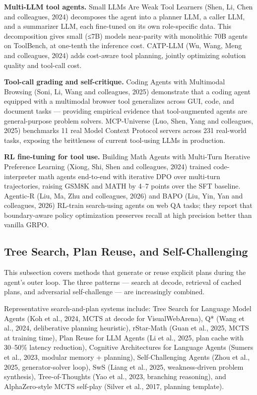 \textbf{Multi-LLM tool agents.} Small LLMs Are Weak Tool Learners (Shen, Li, Chen and colleagues, 2024) decomposes the agent into a planner LLM, a caller LLM, and a summarizer LLM, each fine-tuned on its own role-specific data. This decomposition gives small (≤7B) models near-parity with monolithic 70B agents on ToolBench, at one-tenth the inference cost. CATP-LLM (Wu, Wang, Meng and colleagues, 2024) adds cost-aware tool planning, jointly optimizing solution quality and tool-call cost.

\textbf{Tool-call grading and self-critique.} Coding Agents with Multimodal Browsing (Soni, Li, Wang and colleagues, 2025) demonstrate that a coding agent equipped with a multimodal browser tool generalizes across GUI, code, and document tasks --- providing empirical evidence that tool-augmented agents are general-purpose problem solvers. MCP-Universe (Luo, Shen, Yang and colleagues, 2025) benchmarks 11 real Model Context Protocol servers across 231 real-world tasks, exposing the brittleness of current tool-using LLMs in production.

\textbf{RL fine-tuning for tool use.} Building Math Agents with Multi-Turn Iterative Preference Learning (Xiong, Shi, Shen and colleagues, 2024) trained code-interpreter math agents end-to-end with iterative DPO over multi-turn trajectories, raising GSM8K and MATH by 4--7 points over the SFT baseline. Agentic-R (Liu, Ma, Zhu and colleagues, 2026) and BAPO (Liu, Yin, Yan and colleagues, 2026) RL-train search-using agents on web QA tasks; they report that boundary-aware policy optimization preserves recall at high precision better than vanilla GRPO.

\subsection{Tree Search, Plan Reuse, and Self-Challenging}\label{tree-search-plan-reuse-and-self-challenging}

This subsection covers methods that generate or reuse explicit plans during the agent's outer loop. The three patterns --- search at decode, retrieval of cached plans, and adversarial self-challenge --- are increasingly combined.

Representative search-and-plan systems include: Tree Search for Language Model Agents (Koh et al., 2024, MCTS at decode for VisualWebArena), Q* (Wang et al., 2024, deliberative planning heuristic), rStar-Math (Guan et al., 2025, MCTS at training time), Plan Reuse for LLM Agents (Li et al., 2025, plan cache with 30--50\% latency reduction), Cognitive Architectures for Language Agents (Sumers et al., 2023, modular memory + planning), Self-Challenging Agents (Zhou et al., 2025, generator-solver loop), SwS (Liang et al., 2025, weakness-driven problem synthesis), Tree-of-Thoughts (Yao et al., 2023, branching reasoning), and AlphaZero-style MCTS self-play (Silver et al., 2017, planning template).


